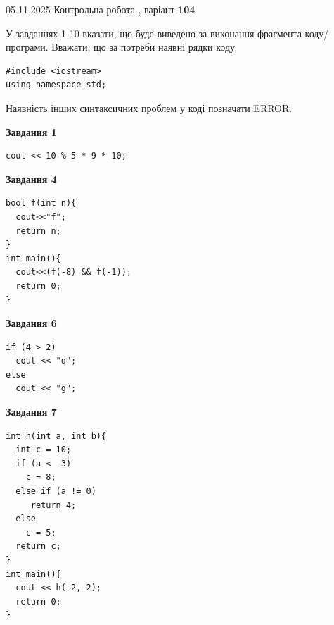 \documentclass[12pt, ukrainian]{article}
\begin{document}
{\Large{05.11.2025 Контрольна робота , варіант  \No \textbf { 104 }\par}}
{
\begin {large}
У завданнях 1-10 вказати, що буде виведено за виконання фрагмента коду/про\-гра\-ми.
Вважати, що за потреби наявні рядки коду
\begin{verbatim}
#include <iostream>
using namespace std;
\end{verbatim}
Наявність інших синтаксичних проблем у коді позначати ERROR.

\begin{minipage}[t]{7.0cm}

\begin{center}
\textbf{Завдання 1}
\end{center}
\vspace{-8mm}

\begin{verbatim}
cout << 10 % 5 * 9 * 10;
\end{verbatim}



\begin{center}
\textbf{Завдання 4}
\end{center}
\vspace{-8mm}

\begin{verbatim}
bool f(int n){
  cout<<"f";
  return n;
}
int main(){
  cout<<(f(-8) && f(-1));
  return 0;
}
\end{verbatim}



\begin{center}
\textbf{Завдання 6}
\end{center}
\vspace{-8mm}

\begin{verbatim}
if (4 > 2)
  cout << "q";
else
  cout << "g";
\end{verbatim}



\begin{center}
\textbf{Завдання 7}
\end{center}
\vspace{-8mm}

\begin{verbatim}
int h(int a, int b){
  int c = 10;
  if (a < -3)
    c = 8;
  else if (a != 0)
     return 4;
  else
    c = 5;
  return c;
}
int main(){
  cout << h(-2, 2);
  return 0;
}
\end{verbatim}


\end{minipage}
\end{large}}
\end{document}
